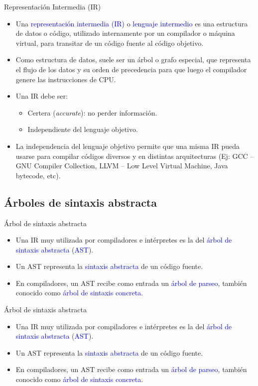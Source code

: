 \documentclass[handout]{beamer} %
\newcommand{\blue}[1]{\textcolor{blue}{#1}}
\begin{document}
\begin{frame}{Representación Intermedia (IR)}
    \begin{itemize}
        \item<1-> Una \blue{representación intermedia (IR)} o \blue{lenguaje intermedio} es una estructura de datos o código, utilizado internamente por un compilador o máquina virtual, para transitar de un código fuente al código objetivo.
        \item<2-> Como estructura de datos, suele ser un árbol o grafo especial, que representa el flujo de los datos y su orden de precedencia para que luego el compilador genere las instrucciones de CPU.
        \item<3-> Una IR debe ser:
        \begin{itemize}
            \item Certera ({\em accurate}): no perder información.
            \item Independiente del lenguaje objetivo.
        \end{itemize}
        \item<4-> La independencia del lenguaje objetivo permite que una misma IR pueda usarse para compilar códigos diversos y en distintas arquitecturas (Ej: GCC -- GNU Compiler Collection, LLVM -- Low Level Virtual Machine, Java bytecode, etc).
    \end{itemize}
\end{frame}

\subsection{Árboles de sintaxis abstracta}

\begin{frame}{Árbol de sintaxis abstracta}
    \begin{itemize}
        \item<1-> Una IR muy utilizada por compiladores e intérpretes es la del \blue{árbol de sintaxis abstracta} (\blue{AST}).
        \item<2-> Un AST representa la \blue{sintaxis abstracta} de un código fuente.
        \item<3-> En compiladores, un AST recibe como entrada un \blue{árbol de parseo}, también conocido como \blue{árbol de sintaxis concreta}.
    \end{itemize}
\end{frame}

\begin{frame}{Árbol de sintaxis abstracta}
    \begin{itemize}
        \item<1-> Una IR muy utilizada por compiladores e intérpretes es la del \blue{árbol de sintaxis abstracta} (\blue{AST}).
        \item<2-> Un AST representa la \blue{sintaxis abstracta} de un código fuente.
        \item<3-> En compiladores, un AST recibe como entrada un \blue{árbol de parseo}, también conocido como \blue{árbol de sintaxis concreta}.
    \end{itemize}
\end{frame}
\end{document}

